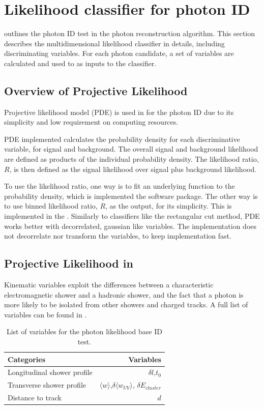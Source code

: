 \section{Likelihood classifier for photon ID}
\label{sec:photonLikelihood}

 outlines the photon ID test in the photon reconstruction algorithm. This section describes the multidimensional likelihood classifier in details, including discriminating variables. For each photon candidate, a set of variables are calculated and used to as inputs to the classifier.

\subsection{Overview of Projective Likelihood}
\label{sec:photonPDE}
Projective likelihood model (PDE) is used in \pandora for the photon ID due to its simplicity and low requirement on computing resources.

PDE implemented calculates the probability density for each discriminative variable, for signal and background. The overall signal and background likelihood are defined as products of the individual probability density. The likelihood ratio, $R$, is then defined as the signal likelihood over signal plus background likelihood.

To use the likelihood ratio, one way is to fit an underlying function to the probability density, which is implemented the \TMVA software package. The other way is to use binned likelihood ratio, $R$, as the output, for its simplicity. This is implemented in the \pandora. Similarly to classifiers like the rectangular cut method, PDE works better with decorrelated, gaussian like variables. The \pandora implementation does not decorrelate nor transform the variables, to keep implementation fast.

\subsection{Projective Likelihood in \pandora}

Kinematic variables exploit the differences between a characteristic electromagnetic shower and a hadronic shower, and the fact that a photon is more likely to be isolated from other showers and charged tracks. A full list of variables can be found in .

\begin{table}[htbp] \centering \smallskip
\begin{tabular}{l r }
\hline
\hline
Categories&  Variables\\
\hline
Longitudinal shower profile & $\delta{l}$,$t_0$ \\
Transverse shower profile & $\langle{w}\rangle$,$\delta{\langle{w_{UV}}\rangle}$, $\delta E_{cluster}$ \\
Distance to track &  $d$ \\
\hline
\hline
\end{tabular}
\caption
{List of variables for the photon likelihood base ID test.}
\label{tab:photonPhotonIDvar}
\end{table}

